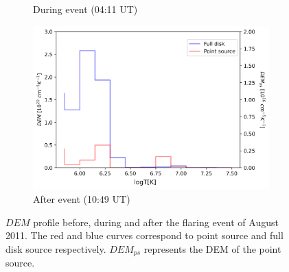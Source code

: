 \begin{figure}[h!]
\begin{subfigure}[b]{0.3\textwidth}
        \caption{During event (04:11 UT)}
        \label{fig:dem_pro_aug_04_2011_b}
    \end{subfigure}
    \hfill
    \begin{subfigure}[b]{0.3\textwidth}
        \centering
        \includegraphics[width=\textwidth]{images/dem_profile_after_event_2011_aug_04.png}
        \caption{After event (10:49 UT)}
        \label{fig:dem_pro_aug_04_2011_c}
    \end{subfigure}

    \caption[DEM profile for  August 2011 event]{$DEM$ profile before, during and after the flaring event of  August 2011. The red and blue curves correspond to point source and full disk source respectively. $DEM_{ps}$ represents the DEM of the point source.}
    \label{fig:dem_pro_aug_04_2011}
\end{figure}

